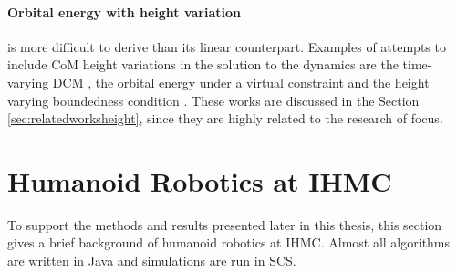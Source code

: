 \paragraph{Orbital energy with height variation}\label{subsec:nonorbit} is more difficult to derive than its linear counterpart.  Examples of attempts to include \ac{CoM} height variations in the solution to the dynamics are the time-varying \ac{DCM} \cite{hopkins2014humanoid}, the orbital energy under a virtual constraint \cite{pratt2007derivation} and the height varying boundedness condition \cite{caron2018balance}. These works are discussed in the Section 
\ref{sec:relatedworksheight}, since they are highly related to the research of focus.

\section{Humanoid Robotics at IHMC}\label{sec:ihmc}
To support the methods and results presented later in this thesis, this section gives a brief background of humanoid robotics at \ac{IHMC}. Almost all algorithms are written in Java and simulations are run in \ac{SCS}.
